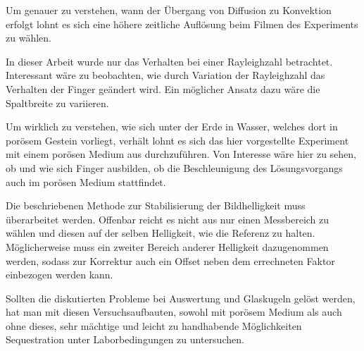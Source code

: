Um genauer zu verstehen, wann der Übergang von Diffusion zu Konvektion erfolgt lohnt es sich eine höhere zeitliche Auflösung beim Filmen des Experiments zu wählen.

In dieser Arbeit wurde nur das Verhalten bei einer Rayleighzahl betrachtet. Interessant wäre zu beobachten, wie durch Variation der Rayleighzahl das Verhalten der Finger geändert wird. Ein möglicher Ansatz dazu wäre die Spaltbreite zu variieren.

Um wirklich zu verstehen, wie sich \COT unter der Erde in Wasser, welches dort in porösem Gestein vorliegt, verhält lohnt es sich das hier vorgestellte \COTm Experiment mit einem porösen Medium aus \BOG durchzuführen. Von Interesse wäre hier zu sehen, ob und wie sich Finger ausbilden, \dah ob die Beschleunigung des Lösungsvorgangs auch im porösen Medium stattfindet.


Die beschriebenen Methode zur Stabilisierung der Bildhelligkeit muss überarbeitet werden. Offenbar reicht es nicht aus nur einen Messbereich zu wählen und diesen auf der selben Helligkeit, wie die Referenz zu halten. Möglicherweise muss ein zweiter Bereich anderer Helligkeit dazugenommen werden, sodass zur Korrektur auch ein Offset neben dem errechneten Faktor einbezogen werden kann.


Sollten die diskutierten Probleme bei Auswertung und Glaskugeln gelöst werden, hat man mit diesen Versuchsaufbauten, sowohl mit porösem Medium als auch ohne dieses, sehr mächtige und leicht zu handhabende Möglichkeiten \COTm Sequestration unter Laborbedingungen zu untersuchen.